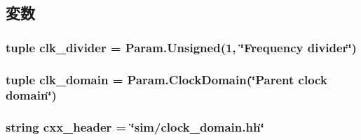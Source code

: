 \subsection{変数}
\hypertarget{classClockDomain_1_1DerivedClockDomain_a445eebf45c5ef75734fd17ddcaf32bc2}{
\subsubsection[{clk\_\-divider}]{\setlength{\rightskip}{0pt plus 5cm}tuple {\bf clk\_\-divider} = Param.Unsigned(1, \char`\"{}Frequency divider\char`\"{})}}
\label{classClockDomain_1_1DerivedClockDomain_a445eebf45c5ef75734fd17ddcaf32bc2}
\hypertarget{classClockDomain_1_1DerivedClockDomain_a596968ab1b20165f058769abb6d2f6ca}{
\subsubsection[{clk\_\-domain}]{\setlength{\rightskip}{0pt plus 5cm}tuple {\bf clk\_\-domain} = Param.ClockDomain(\char`\"{}Parent clock domain\char`\"{})}}
\label{classClockDomain_1_1DerivedClockDomain_a596968ab1b20165f058769abb6d2f6ca}
\hypertarget{classClockDomain_1_1DerivedClockDomain_a17da7064bc5c518791f0c891eff05fda}{
\subsubsection[{cxx\_\-header}]{\setlength{\rightskip}{0pt plus 5cm}string {\bf cxx\_\-header} = \char`\"{}sim/clock\_\-domain.hh\char`\"{}}}
\label{classClockDomain_1_1DerivedClockDomain_a17da7064bc5c518791f0c891eff05fda}


